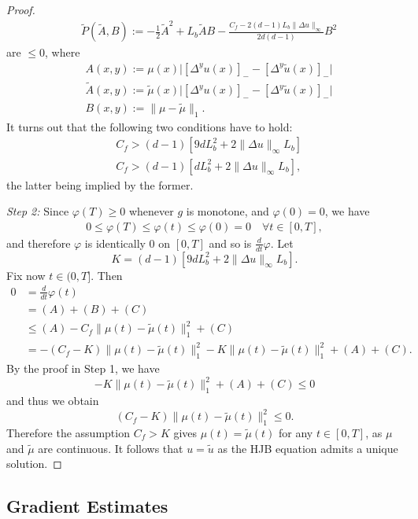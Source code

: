 \documentclass[11pt,a4paper]{amsart}
\theoremstyle{definition}
\newcommand{\norm}[1]{\|#1\|}
\begin{document}
\begin{proof}
\begin{align*}
    &\tilde{P}(\tilde{A},B) := -\frac{1}{2}\tilde{A}^2 + L_b \tilde{A}B - \frac{C_f - 2(d-1)L_b \norm{\Delta u}_{\infty}}{2d(d-1)} B^2
\end{align*}
are $\leq 0$, where
\begin{align*}
    &A(x,y) := \mu(x) \Big| [\Delta^{y}u(x)]_- - [\Delta^{y}\tilde{u}(x)]_- \Big| \\
    &\tilde{A}(x,y) := \tilde\mu(x) \Big| [\Delta^{y}u(x)]_- - [\Delta^{y}\tilde{u}(x)]_- \Big| \\
    &B(x,y) := \norm{\mu - \tilde{\mu}}_1.
\end{align*}
It turns out that the following two conditions have to hold:
\begin{align*}
    &C_f > (d-1) [9 d L_b^2 + 2 \norm{\Delta u}_\infty L_b] \\
    &C_f > (d-1) [d L_b^2 + 2 \norm{\Delta u}_\infty L_b],
\end{align*}
the latter being implied by the former.

\emph{Step 2:}
%
Since $\varphi(T) \geq 0$ whenever $g$ is monotone, and $\varphi(0) = 0$, we have
\begin{align*}
    0 \leq \varphi(T) \leq \varphi(t) \leq \varphi(0) = 0 \quad \forall t \in [0,T],
\end{align*}
and therefore $\varphi$ is identically 0 on $[0,T]$ and so is $\frac{d}{dt}\varphi$. 
Let 
$$K = (d-1) [9 d L_b^2 + 2 \norm{\Delta u}_{\infty} L_b].$$ 
Fix now $t\in (0,T]$. Then
\begin{align*}
    0
    &= \frac{d}{dt}\varphi(t) \\
    &= (A) + (B) + (C) \\
    &\leq (A) - C_f \norm{\mu(t)-\tilde{\mu}(t)}_1^2 + (C) \\
    &= - (C_f - K) \norm{\mu(t)-\tilde{\mu}(t)}_1^2 - K \norm{\mu(t)-\tilde{\mu}(t)}_1^2 + (A) + (C) .
\end{align*}
By the proof in Step 1, we have
\[
- K \norm{\mu(t)-\tilde{\mu}(t)}_1^2 + (A) + (C) \leq 0
\] 
and thus we obtain 
\[
 (C_f - K) \norm{\mu(t)-\tilde{\mu}(t)}_1^2 \leq 0.
\] 
Therefore the assumption $C_f>K$ gives $\mu(t)= \tilde{\mu}(t)$ for any $t\in [0,T]$, as $\mu$ and $\tilde{\mu}$ are continuous. It follows that $u=\tilde{u}$ as the HJB equation admits a unique solution.
\end{proof}



\subsection{Gradient Estimates}\label{sec:gradient estimate}
\end{document}
